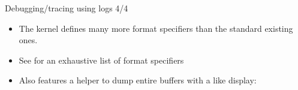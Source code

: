 \begin{frame}[fragile]{Debugging/tracing using logs 4/4}
  \begin{itemize}
  \item The kernel defines many more format specifiers than the standard
     existing ones.
  \item See  for an exhaustive list of format specifiers
  \item Also features a helper to dump entire buffers with a  like display: 
  \end{itemize}
\end{frame}

